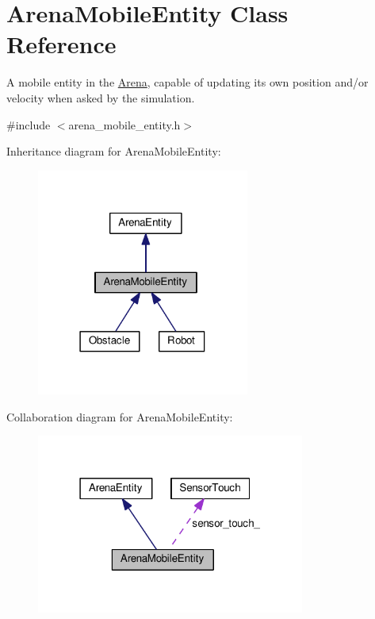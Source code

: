 \hypertarget{classArenaMobileEntity}{}\section{Arena\+Mobile\+Entity Class Reference}
\label{classArenaMobileEntity}


A mobile entity in the \hyperlink{classArena}{Arena}, capable of updating its own position and/or velocity when asked by the simulation.  




{\ttfamily \#include $<$arena\+\_\+mobile\+\_\+entity.\+h$>$}



Inheritance diagram for Arena\+Mobile\+Entity\+:
\nopagebreak
\begin{figure}[H]
\begin{center}
\leavevmode
\includegraphics[width=198pt]{classArenaMobileEntity__inherit__graph}
\end{center}
\end{figure}


Collaboration diagram for Arena\+Mobile\+Entity\+:
\nopagebreak
\begin{figure}[H]
\begin{center}
\leavevmode
\includegraphics[width=250pt]{classArenaMobileEntity__coll__graph}
\end{center}
\end{figure}
